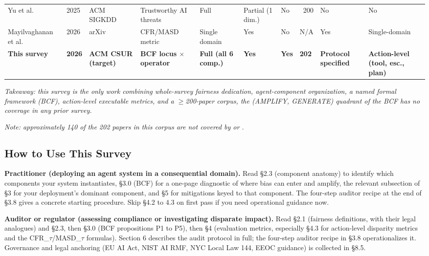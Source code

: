 \documentclass[acmsmall,nonacm]{acmart}
\begin{document}
\begin{table}[htbp]
{{\begin{tabular}{|p{}|p{}|p{}|p{}|p{}|p{}|p{}|p{}|p{}|p{}|}
Yu et al. \cite{yu2025survey} & 2025 & ACM SIGKDD & Trust\-worthy AI threats & Full & Partial (1 dim.) & No & ~200 & No & No \\
Mayil\-vaghanan et al. \cite{mayilvaghanan2026counterfactual} & 2026 & arXiv & CFR/MASD metric & Single domain & Yes & No & N/A & Yes & Single-domain \\
\textbf{This survey} & \textbf{2026} & \textbf{ACM CSUR (target)} & \textbf{BCF locus $\times$ operator} & \textbf{Full (all 6 comp.)} & \textbf{Yes} & \textbf{Yes} & \textbf{202} & \textbf{Protocol specified} & \textbf{Action-level (tool, esc., plan)} \\
\bottomrule
\end{tabular}}%
}
\end{table}%

\emph{Takeaway: this survey is the only work combining whole-survey fairness dedication, agent-component organization, a named formal framework (BCF), action-level executable metrics, and a $\geq$200-paper corpus, the (AMPLIFY, GENERATE) quadrant of the BCF has no coverage in any prior survey.}

\emph{Note: approximately 140 of the 202 papers in this corpus are not covered by \cite{gallegos2024bias} or \cite{chu2024fairness}.}


\subsection{How to Use This Survey}

\textbf{Practitioner (deploying an agent system in a consequential domain).} Read \S{}2.3 (component anatomy) to identify which components your system instantiates, \S{}3.0 (BCF) for a one-page diagnostic of where bias can enter and amplify, the relevant subsection of \S{}3 for your deployment's dominant component, and \S{}5 for mitigations keyed to that component. The four-step auditor recipe at the end of \S{}3.8 gives a concrete starting procedure. Skip \S{}4.2 to 4.3 on first pass if you need operational guidance now.

\textbf{Auditor or regulator (assessing compliance or investigating disparate impact).} Read \S{}2.1 (fairness definitions, with their legal analogues) and \S{}2.3, then \S{}3.0 (BCF propositions P1 to P5), then \S{}4 (evaluation metrics, especially \S{}4.3 for action-level disparity metrics and the CFR\_$\tau$/MASD\_$\tau$ formulas). Section 6 describes the audit protocol in full; the four-step auditor recipe in \S{}3.8 operationalizes it. Governance and legal anchoring (EU AI Act, NIST AI RMF, NYC Local Law 144, EEOC guidance) is collected in \S{}8.5.
\end{document}

